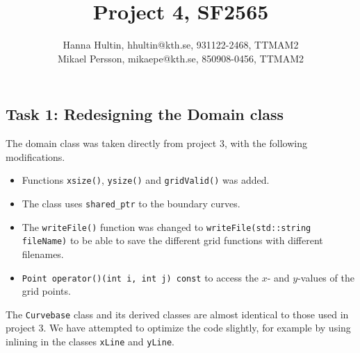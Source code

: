 \documentclass[a4paper,10pt]{article}
\title{Project 4, SF2565}
\author{Hanna Hultin, hhultin@kth.se, 931122-2468, TTMAM2 \\ Mikael Persson, mikaepe@kth.se, 850908-0456, TTMAM2}
\begin{document}
\maketitle

\subsection*{Task 1: Redesigning the Domain class}
The domain class was taken directly from project 3, with the following modifications. 
\begin{itemize}
  \item
    Functions \texttt{xsize()}, \texttt{ysize()} and \texttt{gridValid()} was added.
  \item 
    The class uses \texttt{shared\_ptr} to the boundary curves. 
  \item
    The \texttt{writeFile()} function was changed to 
    \texttt{writeFile(std::string fileName)} to be able to save the 
    different grid functions with different filenames.
  \item
    \texttt{Point operator()(int i, int j) const} to access the $x$- and $y$-values of the grid points.
\end{itemize}
The \texttt{Curvebase} class and its derived classes are almost identical to those used in 
project 3. We have attempted to optimize the code slightly, for example by using inlining 
in the classes \texttt{xLine} and \texttt{yLine}.
\end{document}
